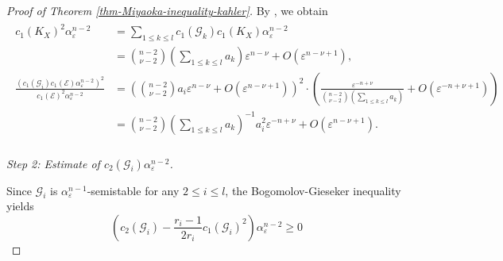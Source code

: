 \documentclass[12pt]{amsart}
\theoremstyle{definition}
\theoremstyle{remark}
\numberwithin{equation}{section}
\begin{document}
\begin{proof}[Proof of Theorem \ref{thm-Miyaoka-inequality-kahler}]
By \cite[Section 6]{IM22}, we obtain 
\begin{align}
\begin{split}
\label{eq-estimate-epsilon}
c_1(K_X)^2\alpha_{ \varepsilon }^{n-2} 
&= \sum_{1\le k\le l}c_1(\mathcal{G}_k)c_1(K_X)\alpha_{ \varepsilon }^{n-2} \\
&=\binom{n-2}{\nu-2} \left(\sum_{1\le k\le l} a_k \right) \varepsilon ^{n-\nu}+ O( \varepsilon ^{n-\nu +1}),  \\
\frac{(c_1(\mathcal{G}_i)c_1(\mathcal{E}) \alpha_{ \varepsilon }^{n-2})^2}{c_1(\mathcal{E})^2 \alpha_{ \varepsilon }^{n-2}} 
&=\left(\binom{n-2}{\nu-2} a_i \varepsilon ^{n-\nu}+ O( \varepsilon ^{n-\nu +1}) \right)^2
\cdot \left( \frac{ \varepsilon ^{-n+\nu}}{\binom{n-2}{\nu-2}\left(\sum_{1\le k\le l} a_k \right)}+ O( \varepsilon ^{-n+\nu+1}) \right) \\
&= \binom{n-2}{\nu-2} \left(\sum_{1\le k\le l} a_k \right)^{-1} a_{i}^{2} \varepsilon^{-n+\nu} + O( \varepsilon ^{n-\nu +1}).\\
\end{split}
\end{align}

\vspace{0.5\baselineskip}
\emph{Step 2: Estimate of $c_2(\mathcal{G}_i)\alpha_{\varepsilon}^{n-2}$.}
\vspace{0.5\baselineskip}

 Since $\mathcal{G}_i$ is $\alpha_{\varepsilon}^{n-1}$-semistable for any $2 \le i \le l$, the Bogomolov-Gieseker inequality yields
\begin{equation}
\label{eq-BG}
\left( c_2(\mathcal{G}_i) - \frac{r_i - 1}{2r_i}c_1(\mathcal{G}_i)^2 \right)\alpha_{\varepsilon}^{n-2} \ge 0
\end{equation}


\end{proof}
\end{document}

